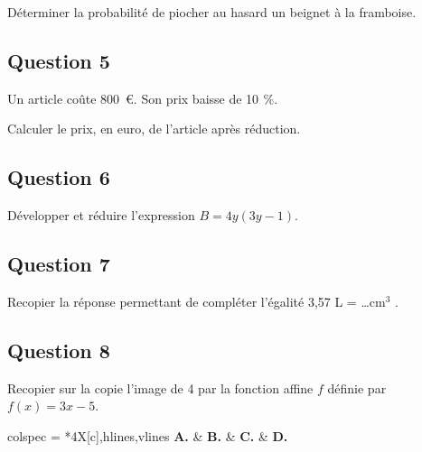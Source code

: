 \documentclass[12pt,a4paper,french]{article}
\begin{document}
Déterminer la probabilité de piocher au hasard un beignet à la framboise.



\subsection*{Question 5}

\medskip

Un article coûte $800$~\euro{}. Son prix baisse de 10$~\,\%$.

Calculer le prix, en euro, de l'article après réduction.



\subsection*{Question 6}

\medskip

Développer et réduire l'expression $B = 4y(3y - 1)$.



\subsection*{Question 7}

\medskip

Recopier la réponse permettant de compléter l'égalité 3,57 L = \ldots cm$^3$
.


\subsection*{Question 8}

\medskip

Recopier sur la copie l'image de 4 par la fonction affine $f$ définie par $f(x) = 3x - 5$.

\begin{tblr}{colspec = {*4{X[c]}},hlines,vlines}
	\textbf{A.} &
	\textbf{B.} &
	\textbf{C.} &
	\textbf{D.}\\
\end{tblr}
\end{document}
